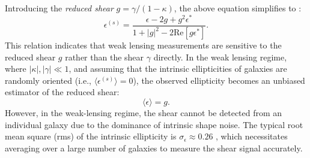 Introducing the \emph{reduced shear} $g = \gamma / (1 - \kappa)$, the above equation simplifies to \citep{1995A&A...294..411S}:
\begin{equation}
    \epsilon^{(s)} = \frac{\epsilon - 2g + g^2 \epsilon^*}{1 + |g|^2 - 2 \text{Re}[g \epsilon^*]}.
    \label{eq:reduced_shear_ellipticity_g}
\end{equation}
This relation indicates that weak lensing measurements are sensitive to the reduced shear $g$ rather than the shear $\gamma$ directly. In the weak lensing regime, where $|\kappa|, |\gamma| \ll 1$, and assuming that the intrinsic ellipticities of galaxies are randomly oriented (i.e., $\langle \epsilon^{(s)} \rangle = 0$), the observed ellipticity becomes an unbiased estimator of the reduced shear:
\begin{equation}
    \langle \epsilon \rangle = g.
    \label{eq:reduced_shear_expectation}
\end{equation}
However, in the weak-lensing regime, the shear cannot be detected from an individual galaxy due to the dominance of intrinsic shape noise. The typical root mean square (rms) of the intrinsic ellipticity is $\sigma_\epsilon \approx 0.26$ \citep{2019A&A...627A..59E}, which necessitates averaging over a large number of galaxies to measure the shear signal accurately.

